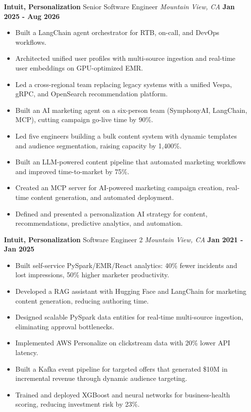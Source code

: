 \documentclass[10pt, letterpaper]{article}
\newcommand{\jobentry}[4]{
  \noindent\textbf{#1} \hfill #2 \hfill \textit{#3} \hfill \textbf{#4}
}
\begin{document}
\jobentry{Intuit, Personalization}{Senior Software Engineer}{Mountain View, CA}{Jan 2025 - Aug 2026}
\begin{itemize}
\item Built a LangChain agent orchestrator for RTB, on-call, and DevOps workflows.
\item Architected unified user profiles with multi-source ingestion and real-time user embeddings on GPU-optimized EMR.
\item Led a cross-regional team replacing legacy systems with a unified Vespa, gRPC, and OpenSearch recommendation platform.
\item Built an AI marketing agent on a six-person team (SymphonyAI, LangChain, MCP), cutting campaign go-live time by 90\%.
\item Led five engineers building a bulk content system with dynamic templates and audience segmentation, raising capacity by 1,400\%.
\item Built an LLM-powered content pipeline that automated marketing workflows and improved time-to-market by 75\%.
\item Created an MCP server for AI-powered marketing campaign creation, real-time content generation, and automated deployment.
\item Defined and presented a personalization AI strategy for content, recommendations, predictive analytics, and automation.
\end{itemize}

\jobentry{Intuit, Personalization}{Software Engineer 2}{Mountain View, CA}{Jan 2021 - Jan 2025}
\begin{itemize}
\item Built self-service PySpark/EMR/React analytics: 40\% fewer incidents and lost impressions, 50\% higher marketer productivity.
\item Developed a RAG assistant with Hugging Face and LangChain for marketing content generation, reducing authoring time.
\item Designed scalable PySpark data entities for real-time multi-source ingestion, eliminating approval bottlenecks.
\item Implemented AWS Personalize on clickstream data with 20\% lower API latency.
\item Built a Kafka event pipeline for targeted offers that generated \$10M in incremental revenue through dynamic audience targeting.
\item Trained and deployed XGBoost and neural networks for business-health scoring, reducing investment risk by 23\%.
\end{itemize}
\end{document}

